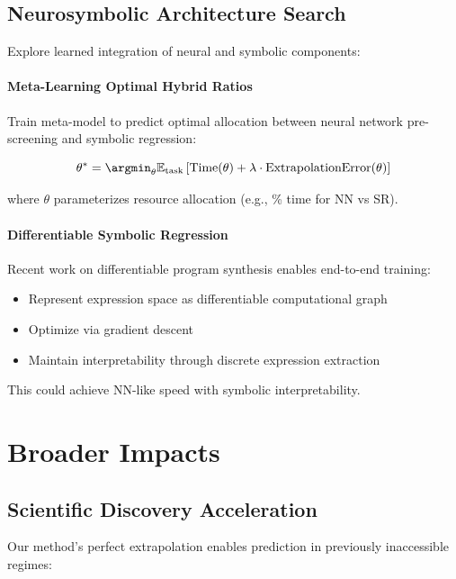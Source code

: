\subsection{Neurosymbolic Architecture Search}

Explore learned integration of neural and symbolic components:

\paragraph{Meta-Learning Optimal Hybrid Ratios}
Train meta-model to predict optimal allocation between neural network pre-screening and symbolic regression:

\begin{equation}
\theta^* = \argmin_\theta \mathbb{E}_{\text{task}} \left[ \text{Time}(\theta) + \lambda \cdot \text{ExtrapolationError}(\theta) \right]
\end{equation}

where $\theta$ parameterizes resource allocation (e.g., \% time for NN vs SR).

\paragraph{Differentiable Symbolic Regression}
Recent work on differentiable program synthesis \citep{petersen2021deep} enables end-to-end training:
\begin{itemize}
    \item Represent expression space as differentiable computational graph
    \item Optimize via gradient descent
    \item Maintain interpretability through discrete expression extraction
\end{itemize}

This could achieve NN-like speed with symbolic interpretability.

\section{Broader Impacts}
\label{sec:impacts}

\subsection{Scientific Discovery Acceleration}

Our method's perfect extrapolation enables prediction in previously inaccessible regimes:

